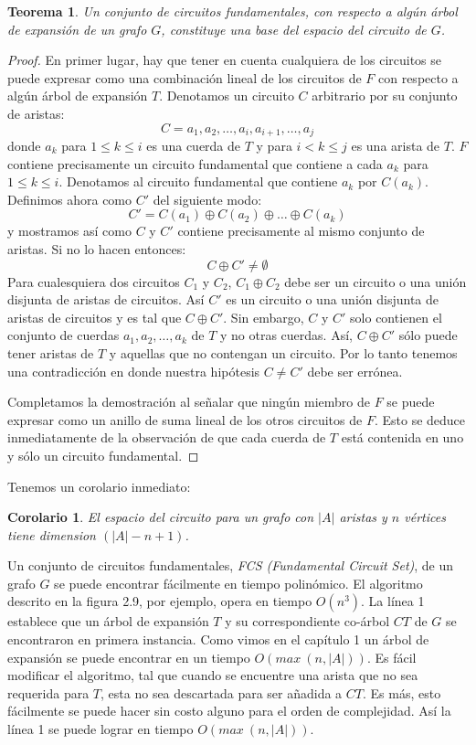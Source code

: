 \documentclass[10pt,a5paper]{book}
\newtheorem{teorema}{Teorema}[chapter]
\newtheorem{cor}[]{Corolario}[chapter]
\begin{document}
\begin{teorema}
Un conjunto de circuitos fundamentales, con respecto a algún árbol de expansión de un grafo $G$, constituye una base del espacio del
circuito de $G$.
\end{teorema}
\begin{proof}
En primer lugar, hay que tener en cuenta cualquiera de los circuitos se puede expresar como una combinación lineal de los circuitos de $F$ con respecto a algún árbol de expansión $T$. Denotamos un circuito $C$ arbitrario por su conjunto de aristas:
\[ C = {a_1, a_2, \ldots, a_i, a_{i+1}, \ldots, a_j}\]
donde $a_k$ para $1 \le k \le i$ es una cuerda de $T$ y para $i < k \le j$ es una arista de $T$. $F$ contiene precisamente un circuito fundamental que contiene a cada $a_k$ para $1 \le k \le i$. Denotamos al circuito fundamental que contiene $a_k$ por $C(a_k)$. Definimos ahora como $C'$ del siguiente modo:
\[ C' = C(a_1) \oplus C(a_2) \oplus \ldots \oplus C(a_k) \]
y mostramos así como $C$ y $C'$ contiene precisamente al mismo conjunto de aristas. Si no lo hacen entonces:
\[ C \oplus C' \ne \emptyset \]
Para cualesquiera dos circuitos $C_1$ y $C_2$, $C_1 \oplus C_2$ debe ser un circuito o una unión disjunta de aristas de circuitos. Así $C'$ es un circuito o una unión disjunta de aristas de circuitos y es tal que $C \oplus C'$. Sin embargo, $C$ y $C'$ solo contienen el conjunto de cuerdas $a_1, a_2, \ldots, a_k$ de $T$ y no otras cuerdas. Así, $C \oplus C'$ sólo puede tener aristas de $T$ y aquellas que no contengan un circuito. Por lo tanto tenemos una contradicción en donde nuestra hipótesis $C \ne C'$ debe ser errónea.

Completamos la demostración al señalar que ningún miembro de $F$ se puede expresar como un anillo de suma lineal de los otros circuitos de $F$. Esto se deduce inmediatamente de la observación de que cada cuerda de $T$ está contenida en uno y sólo un circuito fundamental.
\end{proof}

Tenemos un corolario inmediato:
\begin{cor}
El espacio del circuito para un grafo con $|A|$ aristas y $n$ vértices tiene dimension $(|A| - n + 1)$.
\end{cor}

Un conjunto de circuitos fundamentales, \emph{FCS (Fundamental Circuit Set)}, de un grafo $G$ se puede encontrar fácilmente en tiempo polinómico. El algoritmo descrito en la figura 2.9, por ejemplo, opera en tiempo $O(n^3)$. La línea 1 establece que un árbol de expansión $T$ y su correspondiente co-árbol $CT$ de $G$ se encontraron en primera instancia. Como vimos en el capítulo 1 un árbol de expansión se puede encontrar en un tiempo $O(max\ (n,|A|))$. Es fácil modificar el algoritmo, tal que cuando se encuentre una arista que no sea requerida para $T$, esta no sea descartada para ser añadida a $CT$. Es más, esto fácilmente se puede hacer sin costo alguno para el orden de complejidad. Así la línea 1 se puede lograr en tiempo $O(max\ (n,|A|))$.
\end{document}
